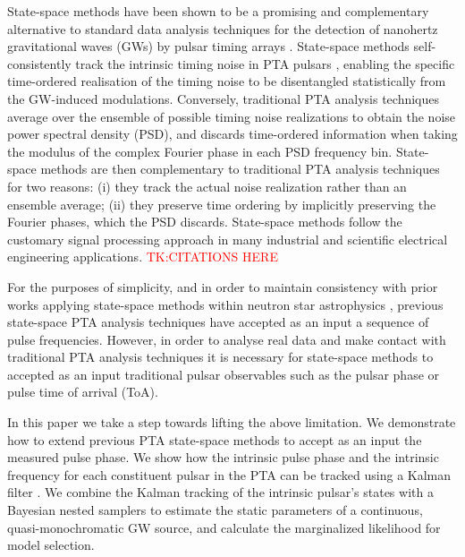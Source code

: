 \documentclass[fleqn,usenatbib,useAMS]{mnras}
\begin{document}
State-space methods have been shown \citep{KimpsonPTA1,KimpsonPTA2} to be a promising and complementary alternative to standard data analysis techniques for the detection of nanohertz gravitational waves (GWs) by pulsar timing arrays  \citep[PTAs;][]{Tiburzi2018, 2021hgwa.bookE...4V}. State-space methods self-consistently track the intrinsic timing noise in PTA pulsars \citep[e.g.][]{Shannon2010,Lasky2015,Caballero2016,Goncharov2021}, enabling the specific time-ordered realisation of the timing noise to be disentangled statistically from the GW-induced modulations. Conversely, traditional PTA analysis techniques average over the ensemble of possible timing noise realizations to obtain the noise power spectral density (PSD), and discards time-ordered information when taking the modulus of the complex Fourier phase in each PSD frequency bin. State-space methods are then complementary to traditional PTA analysis techniques for two reasons: (i) they track the actual noise realization rather than an ensemble average; (ii) they preserve time ordering by implicitly preserving the Fourier phases, which the PSD discards. State-space methods follow the customary signal processing approach in many industrial and scientific electrical engineering applications. \textcolor{red}{TK:CITATIONS HERE} \newline 


For the purposes of simplicity, and in order to maintain consistency with prior works applying state-space methods within neutron star astrophysics \citep[e.g.][]{Myers2021MNRAS.502.3113M,Meyers2021}, previous state-space PTA analysis techniques have accepted as an input a sequence of pulse frequencies. However, in order to analyse real data and make contact with traditional PTA analysis techniques it is necessary for state-space methods to accepted as an input traditional pulsar observables such as the pulsar phase or pulse time of arrival (ToA). \newline 


In this paper we take a step towards lifting the above limitation. We demonstrate how to extend previous PTA state-space methods to accept as an input the measured pulse phase. We show how the intrinsic pulse phase and the intrinsic frequency for each constituent pulsar in the PTA can be tracked using a Kalman filter \citep{Kalman1}. We combine the Kalman tracking of the intrinsic pulsar's states with a Bayesian nested samplers \citep{Skilling} to estimate the static parameters of a continuous, quasi-monochromatic GW source, and calculate the marginalized likelihood for model selection.
\end{document}
